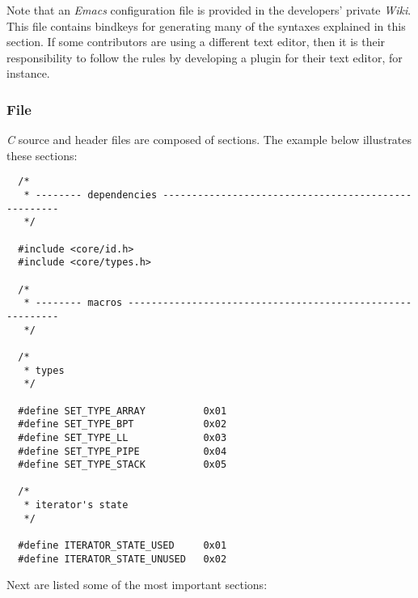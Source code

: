 Note that an \textit{Emacs} configuration file is provided in the
developers' private \textit{Wiki}. This file contains bindkeys for generating
many of the syntaxes explained in this section. If some contributors are using
a different text editor, then it is their responsibility to follow the rules
by developing a plugin for their text editor, for instance.


\subsubsection{File}

\textit{C} source and header files are composed of sections. The example
below illustrates these sections:

\begin{verbatim}
  /*
   * -------- dependencies ----------------------------------------------------
   */

  #include <core/id.h>
  #include <core/types.h>

  /*
   * -------- macros ----------------------------------------------------------
   */

  /*
   * types
   */

  #define SET_TYPE_ARRAY          0x01
  #define SET_TYPE_BPT            0x02
  #define SET_TYPE_LL             0x03
  #define SET_TYPE_PIPE           0x04
  #define SET_TYPE_STACK          0x05

  /*
   * iterator's state
   */

  #define ITERATOR_STATE_USED     0x01
  #define ITERATOR_STATE_UNUSED   0x02
\end{verbatim}

Next are listed some of the most important sections:

